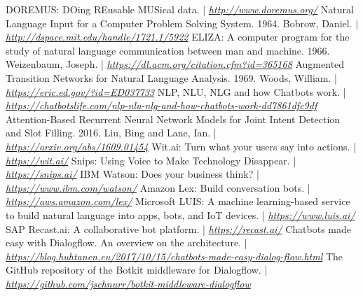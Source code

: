 \documentclass[a4paper,12pt]{report}
\begin{document}
	\begin{thebibliography}{9}
		 DOREMUS: DOing REusable MUSical data. | \textit{\href{http://www.doremus.org/}{http://www.doremus.org/}}
		 Natural Language Input for a Computer Problem Solving System. 1964. Bobrow, Daniel. | \textit{\href{http://dspace.mit.edu/handle/1721.1/5922}{http://dspace.mit.edu/handle/1721.1/5922}}
		 ELIZA: A computer program for the study of natural language communication between man and machine. 1966. Weizenbaum, Joseph. | \textit{\href{https://dl.acm.org/citation.cfm?id=365168}{https://dl.acm.org/citation.cfm?id=365168}}
		 Augmented Transition Networks for Natural Language Analysis. 1969. Woods, William. | \textit{\href{https://eric.ed.gov/?id=ED037733}{https://eric.ed.gov/?id=ED037733}}
		 NLP, NLU, NLG and how Chatbots work. | \textit{\href{https://chatbotslife.com/nlp-nlu-nlg-and-how-chatbots-work-dd7861dfc9df}{https://chatbotslife.com/nlp-nlu-nlg-and-how-chatbots-work-dd7861dfc9df}}
		 Attention-Based Recurrent Neural Network Models for Joint Intent Detection and Slot Filling. 2016. Liu, Bing and Lane, Ian. | \textit{\href{https://arxiv.org/abs/1609.01454}{https://arxiv.org/abs/1609.01454}}
		 Wit.ai: Turn what your users say into actions. | \textit{\href{https://wit.ai/}{https://wit.ai/}}
		 Snips: Using Voice to Make Technology Disappear. | \textit{\href{https://snips.ai/}{https://snips.ai/}}
		 IBM Watson: Does your business think? | \textit{\href{https://www.ibm.com/watson/}{https://www.ibm.com/watson/}}
		 Amazon Lex: Build conversation bots. | \textit{\href{https://aws.amazon.com/lex/}{https://aws.amazon.com/lex/}}
		 Microsoft LUIS: A machine learning-based service to build natural language into apps, bots, and IoT devices. | \textit{\href{https://www.luis.ai/}{https://www.luis.ai/}}
		 SAP Recast.ai: A collaborative bot platform. | \textit{\href{https://recast.ai/}{https://recast.ai/}}
		 Chatbots made easy with Dialogflow. An overview on the architecture. | \textit{\href{https://blog.huhtanen.eu/2017/10/15/chatbots-made-easy-dialog-flow.html}{https://blog.huhtanen.eu/2017/10/15/chatbots-made-easy-dialog-flow.html}}
		 The GitHub repository of the Botkit middleware for Dialogflow. | \textit{\href{https://github.com/jschnurr/botkit-middleware-dialogflow}{https://github.com/jschnurr/botkit-middleware-dialogflow}}
	\end{thebibliography}
\end{document}
